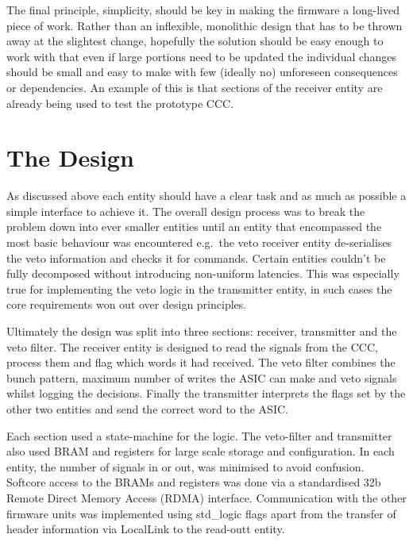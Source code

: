 The final principle, simplicity, should be key in making the firmware a long-lived piece of work. Rather than an inflexible, monolithic design that has to be thrown away at the slightest change, hopefully the solution should be easy enough to work with that even if large portions need to be updated the individual changes should be small and easy to make with few (ideally no) unforeseen consequences or dependencies. An example of this is that sections of the receiver entity are already being used to test the prototype CCC.
\section{The Design} %
\label{sec:the_design}
As discussed above each entity should have a clear task and as much as possible a simple interface to achieve it. The overall design process was to break the problem down into ever smaller entities until an entity that encompassed the most basic behaviour was encountered e.g.\ the veto receiver entity de-serialises the veto information and checks it for commands. Certain entities couldn't be fully decomposed without introducing non-uniform latencies. This was especially true for implementing the veto logic in the transmitter entity, in such cases the core requirements won out over design principles.

Ultimately the design was split into three sections: receiver, transmitter and the veto filter. The receiver entity is designed to read the signals from the CCC, process them and flag which words it had received. The veto filter combines the bunch pattern, maximum number of writes the ASIC can make and veto signals whilst logging the decisions. Finally the transmitter interprets the flags set by the other two entities and send the correct word to the ASIC.

Each section used a state-machine for the logic. The veto-filter and transmitter also used BRAM and registers for large scale storage and configuration. In each entity, the number of signals in or out, was minimised to avoid confusion. Softcore access to the BRAMs and registers was done via a standardised 32b Remote Direct Memory Access (RDMA) interface. Communication with the other firmware units was implemented using std\_logic flags apart from the transfer of header information via LocalLink to the read-outt entity.
